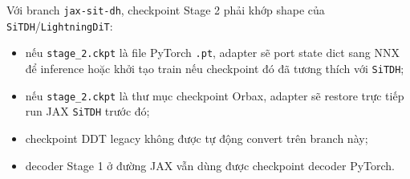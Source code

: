 Với branch \texttt{jax-sit-dh}, checkpoint Stage 2 phải khớp shape của
\texttt{SiTDH}/\texttt{LightningDiT}:

\begin{itemize}[leftmargin=1.5em]
  \item nếu \texttt{stage\_2.ckpt} là file PyTorch \texttt{.pt}, adapter sẽ
  port state dict sang NNX để inference hoặc khởi tạo train nếu checkpoint đó
  đã tương thích với \texttt{SiTDH};
  \item nếu \texttt{stage\_2.ckpt} là thư mục checkpoint Orbax, adapter sẽ
  restore trực tiếp run JAX \texttt{SiTDH} trước đó;
  \item checkpoint DDT legacy không được tự động convert trên branch này;
  \item decoder Stage 1 ở đường JAX vẫn dùng được checkpoint decoder PyTorch.
\end{itemize}
